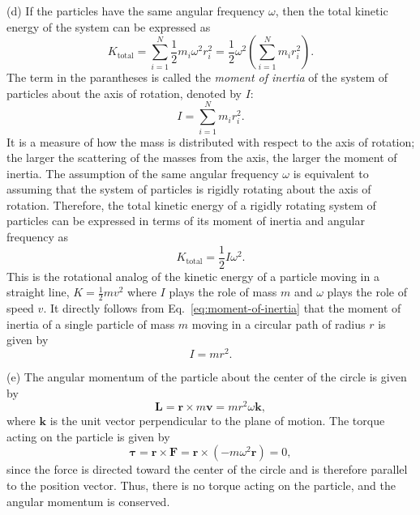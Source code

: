 \documentclass[../main.tex]{subfiles}
\begin{document}
(d) If the particles have the same angular frequency $\omega$, then the total kinetic energy of the system can be expressed as
\begin{equation}
    K_{\text{total}} = \sum_{i=1}^{N} \frac{1}{2} m_i \omega^2 r_i^2 = \frac{1}{2} \omega^2 \left(\sum_{i=1}^{N} m_i r_i^2\right).
\end{equation}
The term in the parantheses is called the \emph{moment of inertia} of the system of particles about the axis of rotation, denoted by $I$:
\begin{equation}
    I = \sum_{i=1}^{N} m_i r_i^2.
    \label{eq:moment-of-inertia}
\end{equation}
It is a measure of how the mass is distributed with respect to the axis of rotation; the larger the scattering of the masses from the axis, the larger the moment of inertia. The assumption of the same angular frequency $\omega$ is equivalent to assuming that the system of particles is rigidly rotating about the axis of rotation. Therefore, the total kinetic energy of a rigidly rotating system of particles can be expressed in terms of its moment of inertia and angular frequency as
\begin{equation}
    K_{\text{total}} = \frac{1}{2} I \omega^2.
\end{equation}
This is the rotational analog of the kinetic energy of a particle moving in a straight line, $K = \frac{1}{2} m v^2$ where $I$ plays the role of mass $m$ and $\omega$ plays the role of speed $v$. It directly follows from Eq.~\ref{eq:moment-of-inertia} that the moment of inertia of a single particle of mass $m$ moving in a circular path of radius $r$ is given by
\begin{equation}
    I = m r^2.
\end{equation}


(e) The angular momentum of the particle about the center of the circle is given by
\begin{equation}
    \mathbf{L} = \mathbf{r} \times m \mathbf{v} = m r^2 \omega \mathbf{k},
\end{equation}
where $\mathbf{k}$ is the unit vector perpendicular to the plane of motion. The torque acting on the particle is given by
\begin{equation}
    \boldsymbol{\tau} = \mathbf{r} \times \mathbf{F} = \mathbf{r} \times (-m \omega^2 \mathbf{r}) = 0,
\end{equation}
since the force is directed toward the center of the circle and is therefore parallel to the position vector. Thus, there is no torque acting on the particle, and the angular momentum is conserved.
\end{document}
